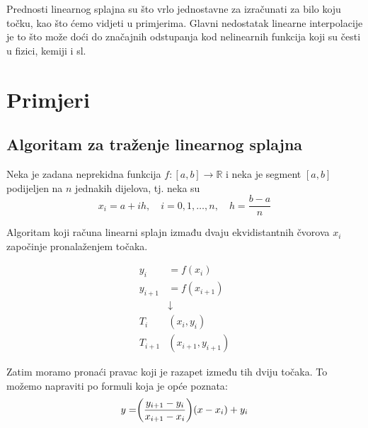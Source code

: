 \documentclass[12pt,a4paper]{report}
\begin{document}
	Prednosti linearnog splajna su što vrlo jednostavne za izračunati za bilo koju točku, kao što ćemo vidjeti u primjerima. Glavni nedostatak linearne interpolacije je to što može doći do značajnih odstupanja kod nelinearnih funkcija koji su česti u fizici, kemiji i sl.
	\section{Primjeri}
		\subsection{Algoritam za traženje linearnog splajna}
		Neka je zadana neprekidna funkcija $f:[a,b]\rightarrow \mathbb{R} $ i neka je segment $[a,b]$ podijeljen na $n$ jednakih dijelova, tj. neka su
		\begin{equation*}
			x_i=a+ih,\quad i=0,1,\ldots,n,\quad h=\frac{b-a}{n}
		\end{equation*}
		
		Algoritam koji računa linearni splajn izmađu dvaju ekvidistantnih čvorova $x_i$ započinje pronalaženjem točaka.
		
		\begin{align*}
			y_i&=f(x_i)\\
			y_{i+1}&=f(x_{i+1})\\
			&\downarrow\\
			T_i&(x_i, y_i)\\
			T_{i+1}&(x_{i+1}, y_{i+1})
		\end{align*}
		
		Zatim moramo pronaći pravac koji je razapet između tih dviju točaka. To možemo napraviti po formuli koja je opće poznata\cite{pmfPrezp5}:
		\begin{equation}
		y=\biggr{(}\frac{y_{i+1}-y_i}{x_{i+1}-x_i}\biggr{)}(x-x_i)+y_i
		\label{pravac}
		\end{equation}
		
		
\end{document}
